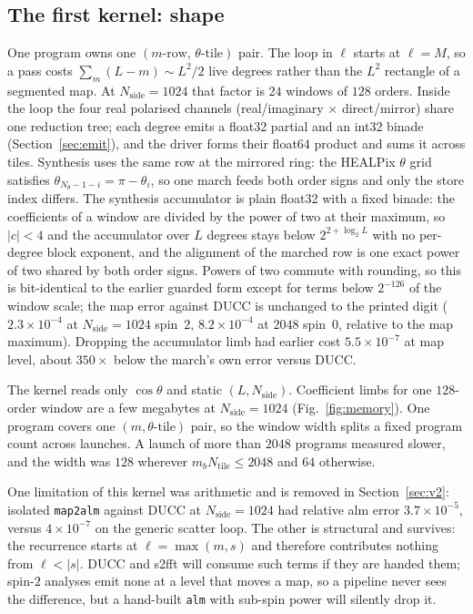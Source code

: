\documentclass[usenatbib,useAMS]{mnras}
\begin{document}
\subsection{The first kernel: shape}
\label{sec:kernel1}

One program owns one $(m\text{-row},\,\theta\text{-tile})$ pair. The loop in $\ell$ starts at $\ell=M$, so a pass costs $\sum_m(L-m)\sim L^2/2$ live degrees rather than the $L^2$ rectangle of a segmented map. At $N_{\mathrm{side}}=1024$ that factor is $24$ windows of $128$ orders. Inside the loop the four real polarised channels (real/imaginary $\times$ direct/mirror) share one reduction tree; each degree emits a float32 partial and an int32 binade (Section~\ref{sec:emit}), and the driver forms their float64 product and sums it across tiles. Synthesis uses the same row at the mirrored ring: the HEALPix $\theta$ grid satisfies $\theta_{N_\theta-1-i}=\pi-\theta_i$, so one march feeds both order signs and only the store index differs. The synthesis accumulator is plain float32 with a fixed binade: the coefficients of a window are divided by the power of two at their maximum, so $\lvert c\rvert<4$ and the accumulator over $L$ degrees stays below $2^{2+\log_2L}$ with no per-degree block exponent, and the alignment of the marched row is one exact power of two shared by both order signs. Powers of two commute with rounding, so this is bit-identical to the earlier guarded form except for terms below $2^{-126}$ of the window scale; the map error against DUCC is unchanged to the printed digit ($2.3\times10^{-4}$ at $N_{\mathrm{side}}=1024$ spin~2, $8.2\times10^{-4}$ at $2048$ spin~0, relative to the map maximum). Dropping the accumulator limb had earlier cost $5.5\times10^{-7}$ at map level, about $350\times$ below the march's own error versus DUCC.

The kernel reads only $\cos\theta$ and static $(L,N_{\mathrm{side}})$. Coefficient limbs for one $128$-order window are a few megabytes at $N_{\mathrm{side}}=1024$ (Fig.~\ref{fig:memory}). One program covers one $(m,\theta\text{-tile})$ pair, so the window width splits a fixed program count across launches. A launch of more than $2048$ programs measured slower, and the width was $128$ wherever $m_b N_{\mathrm{tile}}\le2048$ and $64$ otherwise.

One limitation of this kernel was arithmetic and is removed in Section~\ref{sec:v2}: isolated \texttt{map2alm} against DUCC at $N_{\mathrm{side}}=1024$ had relative alm error $3.7\times10^{-5}$, versus $4\times10^{-7}$ on the generic scatter loop. The other is structural and survives: the recurrence starts at $\ell=\max(m,s)$ and therefore contributes nothing from $\ell<\lvert s\rvert$. DUCC and s2fft will consume such terms if they are handed them; spin-$2$ analyses emit none at a level that moves a map, so a pipeline never sees the difference, but a hand-built \texttt{alm} with sub-spin power will silently drop it.
\end{document}
